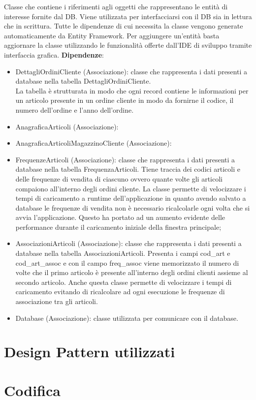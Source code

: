 Classe che contiene i riferimenti agli oggetti che rappresentano le entità di interesse fornite dal DB.
Viene utilizzata per interfacciarsi con il DB sia in lettura che in scrittura.
Tutte le dipendenze di cui necessita la classe vengono generate automaticamente da Entity Framework. Per aggiungere un'entità basta aggiornare
la classe utilizzando le funzionalità offerte dall'IDE di sviluppo tramite interfaccia grafica.
\textbf{Dipendenze}:
\begin{itemize}
    \item DettagliOrdiniCliente (Associazione): classe che rappresenta i dati presenti a database nella tabella DettagliOrdiniCliente.\\
    La tabella è strutturata in modo che ogni record contiene le informazioni per un articolo presente in un ordine cliente in modo da
    fornirne il codice, il numero dell'ordine e l'anno dell'ordine.
    \item AnagraficaArticoli (Associazione): \\
    \item AnagraficaArticoliMagazzinoCliente (Associazione): \\
    \item FrequenzeArticoli (Associazione): classe che rappresenta i dati presenti a database nella tabella FrequenzaArticoli.
    Tiene traccia dei codici articoli e delle frequenze di vendita di ciascuno ovvero quante volte gli articoli compaiono all'interno degli 
    ordini cliente. La classe permette di velocizzare i tempi di caricamento a runtime dell'applicazione in quanto avendo salvato a database
    le frequenze di vendita non è necessario ricalcolarle ogni volta che si avvia l'applicazione. Questo ha portato ad un aumento evidente delle 
    performance durante il caricamento iniziale della finestra principale;\\
    \item AssociazioniArticoli (Associazione): classe che rappresenta i dati presenti a database nella tabella AssociazioniArticoli.
    Presenta i campi cod\_art e cod\_art\_assoc e con il campo freq\_assoc viene memorizzato il numero di volte che il primo articolo è
    presente all'interno degli ordini clienti assieme al secondo articolo.
    Anche questa classe permette di velocizzare i tempi di caricamento evitando di ricalcolare ad ogni esecuzione le frequenze di associazione
    tra gli articoli.\\
    \item Database (Associazione): classe utilizzata per comunicare con il database.\\
\end{itemize}






\section{Design Pattern utilizzati}

\section{Codifica}
